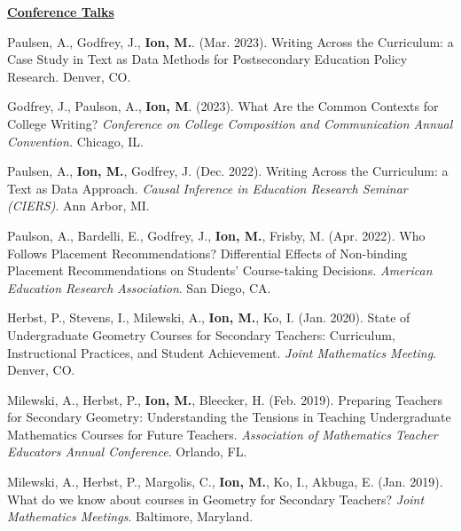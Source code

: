 \documentclass[margin,line]{res}
\newenvironment{list3}{
        \begin{list}{\ding{113}}{%
            \setlength{\itemsep}{0in}
            \setlength{\parsep}{0in} \setlength{\parskip}{0in}
            \setlength{\topsep}{0in} \setlength{\partopsep}{0in}
            \setlength{\leftmargin}{0in}
            \setlength{\rightmargin}{1.25in}}}{\end{list}}
\renewcommand{\subsection}[1]{%
      \par\vspace{3pt}%
      \underline{\normalsize\bfseries #1}%
      \par\vspace{3pt}%
    }
\begin{document}
\begin{resume}
\subsection{\sc Conference Talks} 
\begin{list3} 
  \item Paulsen, A., Godfrey, J., \textbf{Ion, M.}. (Mar. 2023). Writing Across the Curriculum: a Case Study in Text as Data Methods for Postsecondary Education Policy Research. Denver, CO.
  \item Godfrey, J., Paulson, A., \textbf{Ion, M}. (2023). What Are the Common Contexts for College Writing? \textit{Conference on College Composition and Communication Annual Convention.} Chicago, IL.   
  \item Paulsen, A., \textbf{Ion, M.}, Godfrey, J. (Dec. 2022). Writing Across the Curriculum: a Text as Data Approach. \textit{Causal Inference in Education Research Seminar (CIERS)}. Ann Arbor, MI.
  \item Paulson, A., Bardelli, E., Godfrey, J., \textbf{Ion, M.}, Frisby, M. (Apr. 2022). Who Follows Placement Recommendations? Differential Effects of Non-binding Placement Recommendations on Students' Course-taking Decisions. \textit{American Education Research Association}. San Diego, CA. 
  \item Herbst, P., Stevens, I., Milewski, A., \textbf{Ion, M.}, Ko, I. (Jan. 2020). State of Undergraduate Geometry Courses for Secondary Teachers: Curriculum, Instructional Practices, and Student Achievement. \textit{Joint Mathematics Meeting}. Denver, CO. 
  \item Milewski, A., Herbst, P., \textbf{Ion, M.}, Bleecker, H. (Feb. 2019). Preparing Teachers for Secondary Geometry: Understanding the Tensions in Teaching Undergraduate Mathematics Courses for Future Teachers. \textit{Association of Mathematics Teacher Educators Annual Conference}. Orlando, FL. 
  \item Milewski, A., Herbst, P., Margolis, C., \textbf{Ion, M.}, Ko, I., Akbuga, E. (Jan. 2019). What do we know about courses in Geometry for Secondary Teachers? \textit{Joint Mathematics Meetings}. Baltimore, Maryland. 
\end{list3}


\end{resume}
\end{document}
